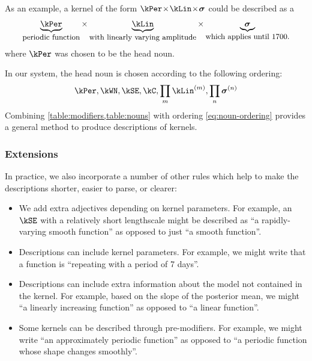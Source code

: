 As an example, a kernel of the form $\kPer \kerntimes  \kLin \kerntimes \boldsymbol{\sigma}$ could be described as a
\begin{align*}
\underbrace{\kPer}_{\textnormal{\small periodic function}} \times 
\underbrace{\kLin}_{\textnormal{\small with linearly varying amplitude}} \times 
\underbrace{\boldsymbol{\sigma}}_{\textnormal{\small which applies until 1700.}}
\end{align*}
where $\kPer$ was chosen to be the head noun.

In our system, the head noun is chosen according to the following ordering:
\begin{align}
\kPer, \kWN, \kSE, \kC, \prod_m \kLin^{(m)}, \prod_n \boldsymbol\sigma^{(n)}
\label{eq:noun-ordering}
\end{align}
Combining \cref{table:modifiers,table:nouns} with ordering \ref{eq:noun-ordering} provides a general method to produce descriptions of kernels.

\subsubsection{Extensions}

In practice, we also incorporate a number of other rules which help to make the descriptions shorter, easier to parse, or clearer:
\begin{itemize}
  \item We add extra adjectives depending on kernel parameters.
        For example, an $\kSE$ with a relatively short lengthscale might be described as ``a rapidly-varying smooth function'' as opposed to just ``a smooth function''.
  \item Descriptions can include kernel parameters.
        For example, we might write that a function is ``repeating with a period of 7 days''.
  \item Descriptions can include extra information about the model not contained in the kernel.
        For example, based on the slope of the posterior mean, we might ``a linearly increasing function'' as opposed to ``a linear function''.
  \item Some kernels can be described through pre-modifiers.
        For example, we might write ``an approximately periodic function'' as opposed to ``a periodic function whose shape changes smoothly''.
\end{itemize}

